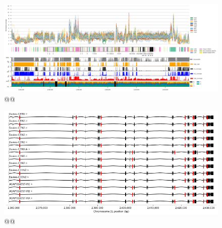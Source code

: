 \documentclass[a4paper,11pt,abstracton,hidelinks]{scrartcl}
\begin{document}
\clearpage
\begin{landscape}

\begin{figure}
\centering
\includegraphics[width=1.1\linewidth,center]{artwork/chapter6/accessibility.png}
\caption{@@
}
\label{fig:accessibility}
\end{figure}

\end{landscape}


\clearpage
\begin{landscape}

\begin{figure}
\centering
\includegraphics[width=0.8\linewidth,center]{artwork/chapter6/transcripts.png}
\caption{@@
}
\label{fig:transcripts}
\end{figure}

\end{landscape}
\end{document}
